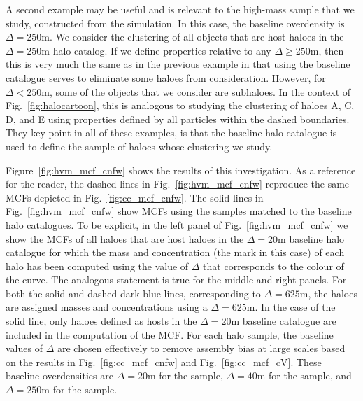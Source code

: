 \documentclass[usenatbib,fleqn]{mnras}
\begin{document}
A second example may be useful and is relevant to the high-mass sample that we study, constructed from the \simC{} simulation. In this case, the baseline overdensity is $\Delta=250$m. We consider the clustering of all objects that are host haloes in the $\Delta=250$m halo catalog. If we define properties relative to any $\Delta \ge 250$m, then this is very much the same as in the previous example in that using the baseline catalogue serves to eliminate some haloes from consideration. However, for $\Delta < 250$m, some of the objects that we consider are subhaloes. In the context of Fig.~\ref{fig:halocartoon}, this is analogous to studying the clustering of haloes A, C, D, and E using properties defined by all particles within the dashed boundaries. They key point in all of these examples, is that the baseline halo catalogue is used to define the sample of haloes whose clustering we study.

Figure~\ref{fig:hvm_mcf_cnfw} shows the results of this investigation. As a reference for the reader, the dashed lines in Fig.~\ref{fig:hvm_mcf_cnfw} reproduce the same MCFs depicted in Fig.~\ref{fig:cc_mcf_cnfw}. The solid lines in Fig.~\ref{fig:hvm_mcf_cnfw} show MCFs using the samples matched to the baseline halo catalogues. To be explicit, in the left panel of Fig.~\ref{fig:hvm_mcf_cnfw} we show the MCFs of all haloes that are host haloes in the  $\Delta=20$m baseline halo catalogue for which the mass and concentration (the mark in this case) of each halo has been computed using the value of $\Delta$ that corresponds to the colour of the curve. The analogous statement is true for the middle and right panels. For both the solid and dashed dark blue lines, corresponding to $\Delta=625$m, the haloes are assigned masses and concentrations using a $\Delta=625$m. In the case of the solid line, only haloes defined as hosts in the $\Delta=20$m baseline catalogue are included in the computation of the MCF. For each halo sample, the baseline values of $\Delta$ are chosen effectively to remove assembly bias at large scales based on the results in Fig.~\ref{fig:cc_mcf_cnfw} and Fig.~\ref{fig:cc_mcf_cV}. These baseline overdensities are $\Delta=20$m for the \simA{} sample, $\Delta=40$m for the \simB{} sample, and $\Delta=250$m for the \simC{} sample. 
\end{document}
